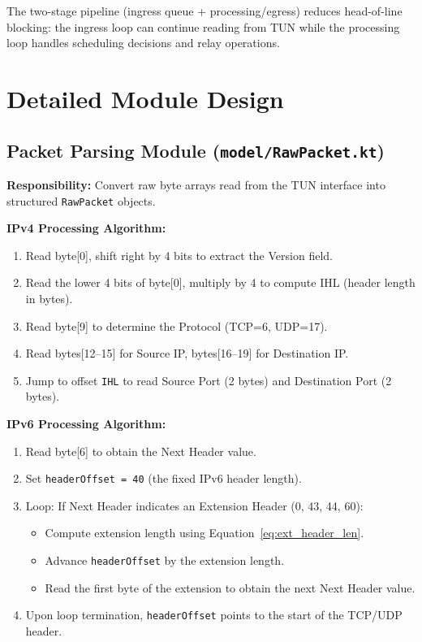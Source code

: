 The two-stage pipeline (ingress queue + processing/egress) reduces head-of-line blocking: the ingress loop can continue reading from TUN while the processing loop handles scheduling decisions and relay operations.


\section{Detailed Module Design}
\label{sec:module_design}

\subsection{Packet Parsing Module (\texttt{model/RawPacket.kt})}

\textbf{Responsibility:} Convert raw byte arrays read from the TUN interface into structured \texttt{RawPacket} objects.

\textbf{IPv4 Processing Algorithm:}
\begin{enumerate}
    \item Read byte[0], shift right by 4 bits to extract the Version field.
    \item Read the lower 4 bits of byte[0], multiply by 4 to compute IHL (header length in bytes).
    \item Read byte[9] to determine the Protocol (TCP=6, UDP=17).
    \item Read bytes[12--15] for Source IP, bytes[16--19] for Destination IP.
    \item Jump to offset \texttt{IHL} to read Source Port (2 bytes) and Destination Port (2 bytes).
\end{enumerate}

\textbf{IPv6 Processing Algorithm:}
\begin{enumerate}
    \item Read byte[6] to obtain the Next Header value.
    \item Set \texttt{headerOffset = 40} (the fixed IPv6 header length).
    \item Loop: If Next Header indicates an Extension Header (0, 43, 44, 60):
    \begin{itemize}
        \item Compute extension length using Equation~\ref{eq:ext_header_len}.
        \item Advance \texttt{headerOffset} by the extension length.
        \item Read the first byte of the extension to obtain the next Next Header value.
    \end{itemize}
    \item Upon loop termination, \texttt{headerOffset} points to the start of the TCP/UDP header.
\end{enumerate}

